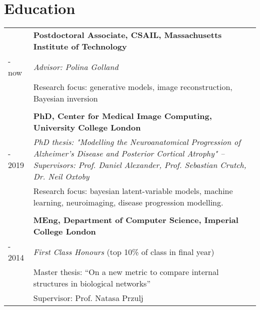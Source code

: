 \documentclass[a4paper,10pt]{article} %
\begin{document}
\section*{Education}


\begin{tabular}{>{\raggedleft\arraybackslash} p{0.93cm}|p{15.7cm}}
2019 & \large\textbf{Postdoctoral Associate, CSAIL, Massachusetts Institute of Technology} \\
- now & \emph{Advisor: Polina Golland}\\
& Research focus: generative models, image reconstruction, Bayesian inversion\\

&\\

2014 & \large\textbf{PhD, Center for Medical Image Computing, University College London}\\
- 2019 & \emph{PhD thesis: "Modelling the Neuroanatomical Progression of
Alzheimer’s Disease and Posterior Cortical Atrophy" -- \small Supervisors: Prof. Daniel Alexander, Prof. Sebastian Crutch, Dr. Neil Oxtoby}\\

& Research focus: bayesian latent-variable models, machine learning, neuroimaging, disease progression modelling.\\

\\
2010 & \large\textbf{MEng, Department of  Computer Science, Imperial College London}\\
- 2014 & \emph{First Class Honours} (top 10\% of class in final year) \\
& Master thesis: ``On a new metric to compare internal structures in biological
networks''\\
& \small Supervisor: Prof. Natasa Przulj\\
\end{tabular}


\end{document}
